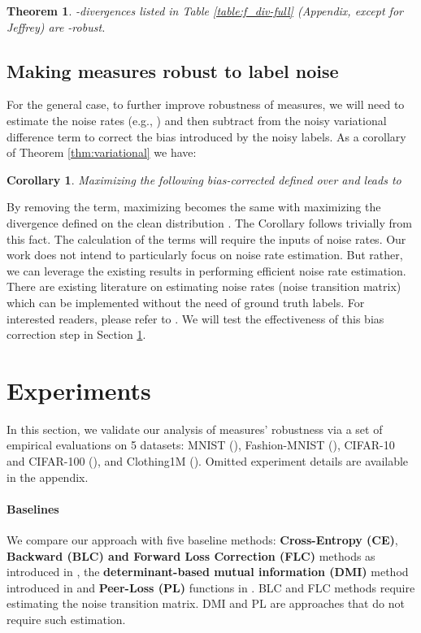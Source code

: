 \documentclass{article}
\newtheorem{theorem}{Theorem}
\newtheorem{corollary}{Corollary}
\begin{document}
\begin{theorem} \label{thm:robust}
-divergences listed in Table \ref{table:f_div-full} (Appendix, except for Jeffrey) are  -robust. 
\end{theorem}


\subsection{Making  measures robust to label noise} 

For the general case, to further improve robustness of  measures, we will need to estimate the noise rates (e.g., ) and then subtract  from the noisy variational difference term to correct the bias introduced by the noisy labels. As a corollary of Theorem \ref{thm:variational} we have:
\begin{corollary}\label{coro:biascorrection}
Maximizing the following bias-corrected  defined over  and  leads to 

\end{corollary}
By removing the  term, maximizing  becomes the same with maximizing the divergence defined on the clean distribution . The Corollary follows trivially from this fact. The calculation of the  terms will require the inputs of noise rates. Our work does not intend to particularly focus on noise rate estimation. But rather, we can leverage the existing results in performing efficient noise rate estimation.  
There are existing literature on estimating noise rates
(noise transition matrix) which can be implemented without the need of ground truth labels. For interested readers, please refer to \citep{Ltl_2015_reweighting, menon2015learning, Scott_kernel_embedding, patrini2017making, LNM_loss_correction,yao2020dual,zhu2021clusterability}. We will test the effectiveness of this bias correction step in Section \ref{sec:exp}.

 \section{Experiments}\label{sec:exp}
In this section, we validate our analysis of  measures' robustness via a set of empirical evaluations on 5 datasets: MNIST (\cite{lecun1998gradient}), Fashion-MNIST (\cite{xiao2017fashionmnist}), CIFAR-10 and CIFAR-100 (\cite{krizhevsky2009learning}), and Clothing1M (\cite{xiao2015learning}). Omitted experiment details are available in the appendix.

\vspace{-0.1in}
\paragraph{Baselines} We compare our approach with five baseline methods: \textbf{Cross-Entropy (CE)}, \textbf{Backward (BLC) and Forward Loss Correction (FLC)} methods as introduced in \citep{patrini2017making}, the \textbf{determinant-based mutual information (DMI)} method introduced in \citep{xu2019l_dmi} and \textbf{Peer-Loss (PL)} functions in \citep{liu2019peer}. BLC and FLC methods require estimating the noise transition matrix. 
DMI  and  PL are approaches that do not require such estimation.
\vspace{-0.1in}
\end{document}
